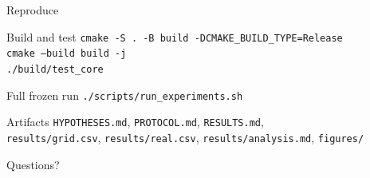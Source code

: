 \documentclass[aspectratio=169,10pt]{beamer}
\begin{document}
\begin{frame}{Reproduce}
  \small
  \begin{block}{Build and test}
    \texttt{cmake -S . -B build -DCMAKE\_BUILD\_TYPE=Release}\\
    \texttt{cmake --build build -j}\\
    \texttt{./build/test\_core}
  \end{block}
  \begin{block}{Full frozen run}
    \texttt{./scripts/run\_experiments.sh}
  \end{block}
  \begin{block}{Artifacts}
    \texttt{HYPOTHESES.md}, \texttt{PROTOCOL.md}, \texttt{RESULTS.md},\\
    \texttt{results/grid.csv}, \texttt{results/real.csv},
    \texttt{results/analysis.md}, \texttt{figures/}
  \end{block}
  \vspace{0.6em}
  \centering
  \Large Questions?
\end{frame}
\end{document}
